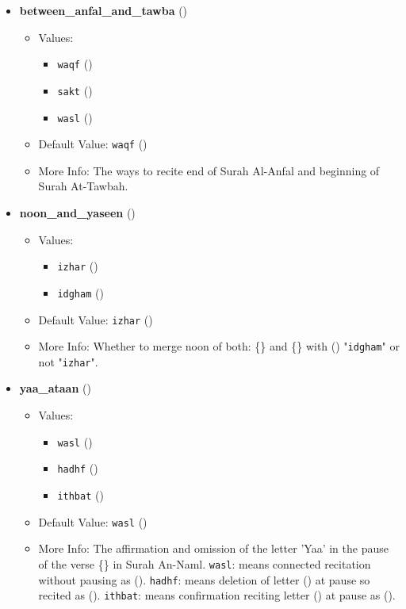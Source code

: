 \begin{itemize}
\item \textbf{between\_anfal\_and\_tawba} ()
  \begin{itemize}
  \item Values: 
    \begin{itemize}
    \item  \texttt{waqf} ()
    \item  \texttt{sakt} ()
    \item  \texttt{wasl} ()
    \end{itemize}
  \item Default Value: \texttt{waqf} ()
  \item More Info: The ways to recite end of Surah Al-Anfal and beginning of Surah At-Tawbah.
  \end{itemize}

\item \textbf{noon\_and\_yaseen} ()
  \begin{itemize}
  \item Values: 
    \begin{itemize}
    \item  \texttt{izhar} ()
    \item  \texttt{idgham} ()
    \end{itemize}
  \item Default Value: \texttt{izhar} ()
  \item More Info: Whether to merge noon of both: \{\} and \{\} with () "\texttt{idgham}" or not "\texttt{izhar}".
  \end{itemize}

\item \textbf{yaa\_ataan} ()
  \begin{itemize}
  \item Values: 
    \begin{itemize}
    \item  \texttt{wasl} ()
    \item  \texttt{hadhf} ()
    \item  \texttt{ithbat} ()
    \end{itemize}
  \item Default Value: \texttt{wasl} ()
  \item More Info: The affirmation and omission of the letter 'Yaa' in the pause of the verse \{\} in Surah An-Naml. \texttt{wasl}: means connected recitation without pausing as (). \texttt{hadhf}: means deletion of letter () at pause so recited as (). \texttt{ithbat}: means confirmation reciting letter () at pause as ().
  \end{itemize}


\end{itemize}
